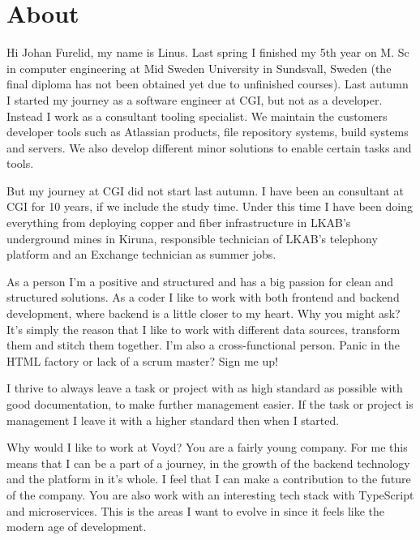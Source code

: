\section{About}
Hi Johan Furelid, my name is Linus. 
Last spring I finished my 5th year on M. Sc in computer engineering at Mid Sweden University in Sundsvall, Sweden (the final diploma has not been obtained yet due to unfinished courses).
Last autumn I started my journey as a software engineer at CGI, but not as a developer.
Instead I work as a consultant tooling specialist.
We maintain the customers developer tools such as Atlassian products, file repository systems, build systems and servers.
We also develop different minor solutions to enable certain tasks and tools. 

But my journey at CGI did not start last autumn. I have been an consultant at CGI for 10 years, if we include the study time.
Under this time I have been doing everything from deploying copper and fiber infrastructure in LKAB's underground mines in Kiruna, responsible technician of LKAB's telephony platform and an Exchange technician as summer jobs.

\bigskip

As a person I'm a positive and structured and has a big passion for clean and structured solutions.
As a coder I like to work with both frontend and backend development, where backend is a little closer to my heart.
Why you might ask? It's simply the reason that I like to work with different data sources, transform them and stitch them together.
I'm also a cross-functional person. Panic in the HTML factory or lack of a scrum master? Sign me up!

I thrive to always leave a task or project with as high standard as possible with good documentation, to make further management easier. 
If the task or project is management I leave it with a higher standard then when I started.

\bigskip

Why would I like to work at Voyd?
You are a fairly young company.
For me this means that I can be a part of a journey, in the growth of the backend technology and the platform in it's whole.
I feel that I can make a contribution to the future of the company.
You are also work with an interesting tech stack with TypeScript and microservices.
This is the areas I want to evolve in since it feels like the modern age of development.

